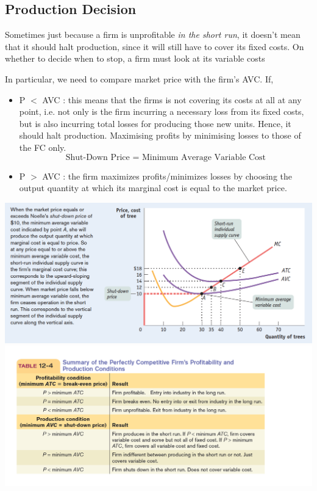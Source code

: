\documentclass[english,course]{Notes}
\newcommand{\ita}[1]{\textit{#1}}
\begin{document}
{\newpage
\subsection{Production Decision}

\par{Sometimes just because a firm is unprofitable \ita{in the short run}, it doesn't mean that it should halt production, since it will still have to cover its fixed costs. On whether to decide when to stop, a firm must look at its variable costs}

\par{In particular, we need to compare market price with the firm's AVC. If, }

\begin{itemize}
	\item P $<$ AVC : this means that the firms is not covering its costs at all at any point, i.e. not only is the firm incurring a necessary loss from its fixed costs, but is also incurring total losses for producing those new units. Hence, it should halt production. Maximising profits by minimising losses to those of the FC only. 
	$$\text{Shut-Down Price = Minimum Average Variable Cost}$$
	\item P $>$ AVC : the firm maximizes profits/minimizes losses by choosing the output quantity at which its marginal cost is equal to the market price.
\end{itemize}


\includegraphics[width=\textwidth]{profit3}
\includegraphics[width=\textwidth]{profitSum}

}
\end{document}
